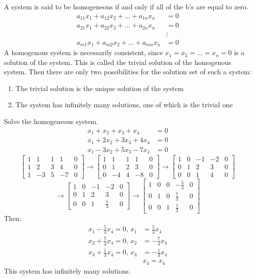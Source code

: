 \documentclass[12pt]{article}
\begin{document}
A system is said to be homogeneous if and only if all of the b's are equal to zero. 
$$ \begin{aligned} a_{11}x_1 + a_{12}x_2 + ... + a_{1n}x_n  &=  0 \\
 a_{21}x_1 + a_{22}x_2 + ... + a_{2n}x_n  &=  0 \\ &\vdots \\
 a_{m1}x_1 + a_{m2}x_2 + ... + a_{mn}x_n  &=  0 \end{aligned} $$ 
 A homogenous system is necessarily consistent, since $ x_1 = x_2 = \dots = x_n = 0 $ is a solution of the system. This is called the trivial solution of the homogenous system. Then there are only two possibilities for the solution set of such a system: \begin{enumerate} 
 \item The trivial solution is the unique solution of the system
 \item The system has infinitely many solutions, one of which is the trivial one \end{enumerate} 
 \begin{example} Solve the homogeneous system. 
$$ \begin{aligned}
 x_1 + x_2 + x_3 + x_4 &= 0 \\ x_1 + 2x_2 + 3x_3 + 4x_4 &= 0 \\ x_1 - 3x_2 + 5x_3 - 7x_4 &= 0 \end{aligned} $$ 
$$ \begin{bmatrix}
1 & 1 & 1 & 1 & 0 \\ 1 & 2 & 3 & 4 & 0 \\ 1 & -3 & 5 & -7 & 0 
\end{bmatrix} \rightarrow 
 \begin{bmatrix}
1 & 1 & 1 & 1 & 0 \\ 0 & 1 & 2 & 3 & 0 \\ 0 & -4 & 4 & -8 & 0
\end{bmatrix} \rightarrow 
 \begin{bmatrix}
1 & 0 & -1 & -2 & 0 \\ 0 & 1 & 2 & 3 & 0 \\ 0 & 0 & 1 & 4 & 0
\end{bmatrix} $$ $$ \rightarrow 
 \begin{bmatrix}
1 & 0 & -1 & -2 & 0 \\ 0 & 1 & 2 & 3 & 0 \\ 0 & 0 & 1 & \frac{1}{3} & 0
\end{bmatrix} \rightarrow  
 \begin{bmatrix}
1 & 0 & 0 & -\frac{5}{3} & 0 \\ 0 & 1 & 0 & \frac{7}{3} & 0 \\ 0 & 0 & 1 & \frac{1}{3} & 0
\end{bmatrix} $$ 
Then: $$ \begin{aligned}
x_1 - \frac{5}{3}x_4 = 0\text{, } x_1 &= \frac{5}{3}x_4 \\
x_2 + \frac{7}{3}x_4 = 0\text{, }  x_2 &= -\frac{7}{3}x_4 \\
x_3 + \frac{1}{3}x_4 = 0\text{, } x_3 &= -\frac{1}{3}x_4 \\
& x_4 = x_4 \end{aligned} $$
This system has infinitely many solutions. 
 \end{example}
\end{document}
